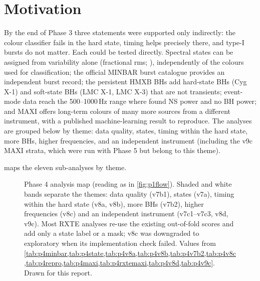 \section{Motivation}
By the end of Phase 3 three statements were supported only indirectly: the colour classifier fails in the hard state,
timing helps precisely there, and type-I bursts do not matter. Each could be tested directly. Spectral states can be
assigned from variability alone (fractional rms; \citealp{RemillardMcClintock2006}), independently of the colours used
for classification; the official MINBAR burst catalogue \citep{Galloway2020} provides an independent burst record; the
persistent HMXB BHs add hard-state BHs (Cyg X-1) and soft-state BHs (LMC X-1, LMC X-3) that are not transients; event-mode
data reach the 500--1000\,Hz range where \citet{SunyaevRevnivtsev2000} found NS power and no BH power; and MAXI offers
long-term colours of many more sources from a different instrument, with a published machine-learning result
\citep{deBeurs2022} to reproduce. The analyses are grouped below by theme: data quality, states, timing within the hard
state, more BHs, higher frequencies, and an independent instrument (including the v9c MAXI strata, which were run with
Phase 5 but belong to this theme).

 maps the eleven sub-analyses by theme.

\begin{figure}[htbp]
\centering

\caption[Phase 4 analysis map]{Phase 4 analysis map (reading as in \cref{fig:p1flow}). Shaded and white bands separate the themes:
data quality (v7b1), states (v7a), timing within the hard state (v8a, v8b), more BHs (v7b2), higher frequencies (v8c) and an
independent instrument (v7c1--v7c3, v8d, v9c). Most RXTE analyses re-use the existing out-of-fold scores and add only a state
label or a mask; v8c was downgraded to exploratory when its implementation check failed. Values from
\cref{tab:p4minbar,tab:p4state,tab:p4v8a,tab:p4v8b,tab:p4v7b2,tab:p4v8c,tab:p4repro,tab:p4maxi,tab:p4rxtemaxi,tab:p4v8d,tab:p4v9c}.
Drawn for this report.}
\label{fig:p4flow}
\end{figure}


